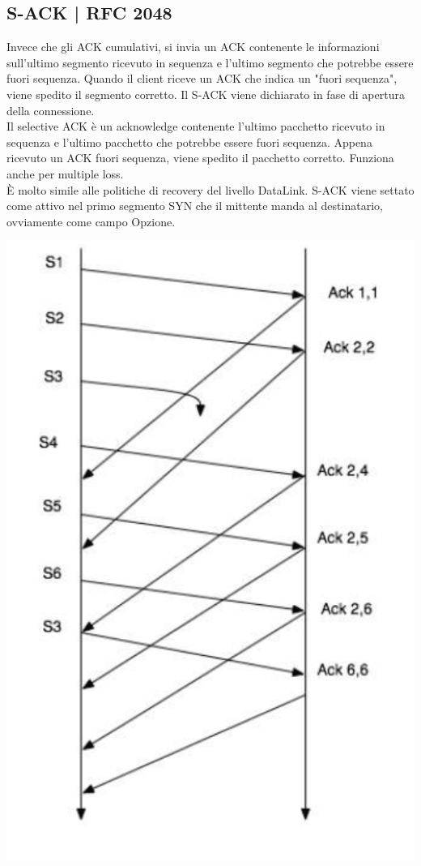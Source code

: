 \documentclass[11pt, oneside]{article}   	%
\begin{document}
\subsection*{S-ACK | RFC 2048}
Invece che gli ACK cumulativi, si invia un ACK contenente le informazioni sull'ultimo segmento ricevuto in sequenza e l'ultimo segmento che potrebbe essere fuori sequenza. Quando il client riceve un ACK che indica un "fuori sequenza", viene spedito il segmento corretto. Il S-ACK viene dichiarato in fase di apertura della connessione.\\
Il selective ACK è un acknowledge contenente l’ultimo pacchetto ricevuto in sequenza e l’ultimo pacchetto che potrebbe essere fuori sequenza. Appena ricevuto un ACK fuori sequenza, viene spedito il pacchetto corretto. Funziona anche per multiple loss.\\
È molto simile alle politiche di recovery del livello DataLink. S-ACK viene settato come attivo nel primo segmento SYN che il mittente manda al destinatario, ovviamente come campo Opzione.
\begin{center}
\includegraphics[scale=0.5]{sack}
\end{center}
\end{document}
